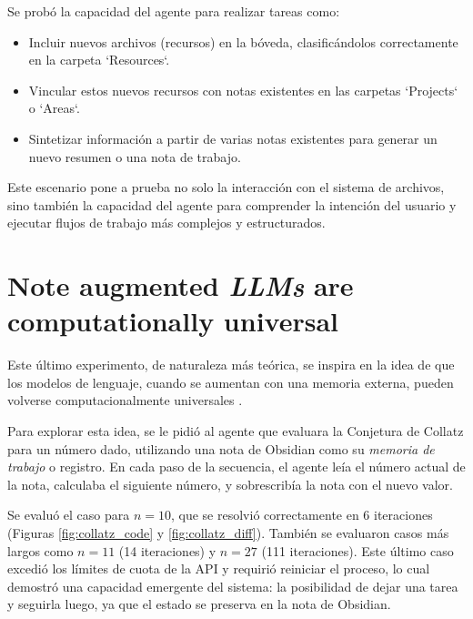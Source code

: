 Se probó la capacidad del agente para realizar tareas como:
\begin{itemize}
    \item Incluir nuevos archivos (recursos) en la bóveda, clasificándolos correctamente en la carpeta `Resources`.
    \item Vincular estos nuevos recursos con notas existentes en las carpetas `Projects` o `Areas`.
    \item Sintetizar información a partir de varias notas existentes para generar un nuevo resumen o una nota de trabajo.
\end{itemize}
Este escenario pone a prueba no solo la interacción con el sistema de archivos, sino también la capacidad del agente para comprender la intención del usuario y ejecutar flujos de trabajo más complejos y estructurados.


\section{Note augmented \textit{LLMs} are computationally universal}
Este último experimento, de naturaleza más teórica, se inspira en la idea de que los modelos de lenguaje, cuando se aumentan con una memoria externa, pueden volverse computacionalmente universales \parencite{schuurmansMemoryAugmentedLarge2023}.

Para explorar esta idea, se le pidió al agente que evaluara la Conjetura de Collatz para un número dado, utilizando una nota de Obsidian como su \textit{memoria de trabajo} o registro. En cada paso de la secuencia, el agente leía el número actual de la nota, calculaba el siguiente número, y sobrescribía la nota con el nuevo valor.

Se evaluó el caso para $n=10$, que se resolvió correctamente en 6 iteraciones (Figuras \ref{fig:collatz_code} y \ref{fig:collatz_diff}). También se evaluaron casos más largos como $n=11$ (14 iteraciones) y $n=27$ (111 iteraciones). Este último caso excedió los límites de cuota de la API y requirió reiniciar el proceso, lo cual demostró una capacidad emergente del sistema: la posibilidad de dejar una tarea y seguirla luego, ya que el estado se preserva en la nota de Obsidian.

